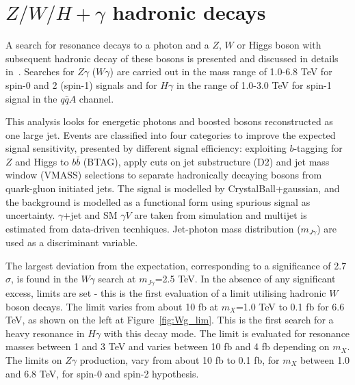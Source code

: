 \documentclass{PoS}
\begin{document}
\section{$Z/W/H+\gamma$ hadronic decays}
\label{sec:gV}
A search for resonance decays to a photon and a $Z$, $W$ or Higgs boson with subsequent hadronic decay of these bosons is presented and discussed in details in~\cite{EXOT-2016-30}. 
Searches for $Z\gamma$ ($W\gamma$) are carried out in the mass range of 1.0-6.8 TeV for spin-0 and 2 (spin-1) signals and for $H\gamma$ in the range of 1.0-3.0 TeV for spin-1 signal in the $q\bar{q}A$ channel.

This analysis looks for energetic photons and boosted bosons reconstructed as one large jet.
Events are classified into four categories to improve the expected signal sensitivity, presented by different signal efficiency:
exploiting $b$-tagging for $Z$ and Higgs to $b\bar{b}$ (BTAG), apply cuts on jet substructure (D2) and jet mass window (VMASS) selections to separate hadronically decaying bosons from quark-gluon initiated jets.
The signal is modelled by CrystalBall+gaussian, and the background is modelled as a functional form using spurious signal as uncertainty. $\gamma$+jet and SM $\gamma V$ are taken from simulation and multijet is estimated from data-driven tecnhiques.
Jet-photon mass distribution ($m_{J \gamma}$) are used as a discriminant variable. %

The largest deviation from the expectation, corresponding to a significance of 2.7$\sigma$, is found in the $W\gamma$ search at $m_{J \gamma}$=2.5 TeV.
In the absence of any significant excess, limits are set - this is the first evaluation of a limit utilising hadronic $W$ boson decays.
The limit varies from about 10 fb at $m_X$=1.0 TeV to 0.1 fb for 6.6 TeV, as shown on the left at Figure~\ref{fig:Wg_lim}. 
This is the first search for a heavy resonance in $H\gamma$ with this decay mode.
The limit is evaluated for resonance masses between 1 and 3 TeV and varies between 10 fb and 4 fb depending on $m_X$.
The limits on $Z\gamma$ production, vary from about 10 fb to 0.1 fb, for $m_X$ between 1.0 and 6.8 TeV, for spin-0 and spin-2 hypothesis. %
\end{document}

